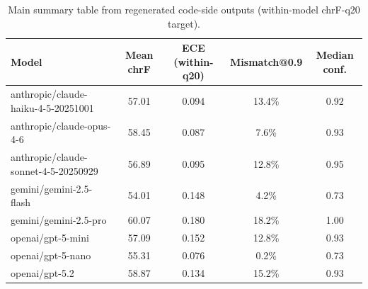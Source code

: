 \begin{table}[t]
\centering
\small
\begin{tabular}{lcccc}
\toprule
Model & Mean chrF & ECE (within-q20) & Mismatch@0.9 & Median conf. \\
\midrule
anthropic/claude-haiku-4-5-20251001 & 57.01 & 0.094 & 13.4\% & 0.92 \\
anthropic/claude-opus-4-6 & 58.45 & 0.087 & 7.6\% & 0.93 \\
anthropic/claude-sonnet-4-5-20250929 & 56.89 & 0.095 & 12.8\% & 0.95 \\
gemini/gemini-2.5-flash & 54.01 & 0.148 & 4.2\% & 0.73 \\
gemini/gemini-2.5-pro & 60.07 & 0.180 & 18.2\% & 1.00 \\
openai/gpt-5-mini & 57.09 & 0.152 & 12.8\% & 0.93 \\
openai/gpt-5-nano & 55.31 & 0.076 & 0.2\% & 0.73 \\
openai/gpt-5.2 & 58.87 & 0.134 & 15.2\% & 0.93 \\
\bottomrule
\end{tabular}
\caption{Main summary table from regenerated code-side outputs (within-model chrF-q20 target).}
\label{tab:main}
\end{table}
